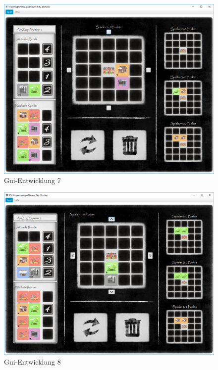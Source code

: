 \begin{figure}
	\centering
	\includegraphics{anhang/pics/Main121018}
	\caption{Gui-Entwicklung 7}
	\label{fig:guiEnwicklung7}
\end{figure}

\begin{figure}
	\centering
	\includegraphics{anhang/pics/Main141018}
	\caption{Gui-Entwicklung 8}
	\label{fig:guiEnwicklung8}
\end{figure}